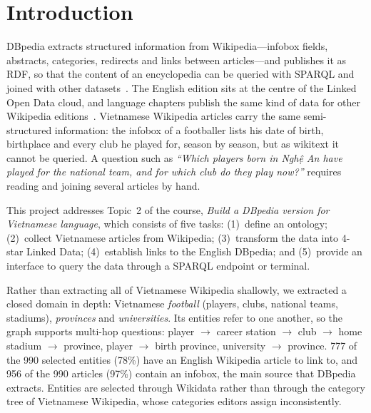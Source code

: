 \section{Introduction}

DBpedia extracts structured information from Wikipedia---infobox fields,
abstracts, categories, redirects and links between articles---and publishes it
as RDF, so that the content of an encyclopedia can be queried with SPARQL and
joined with other datasets~\cite{auer2007dbpedia, lehmann2015dbpedia}. The
English edition sits at the centre of the Linked Open Data cloud, and language
chapters publish the same kind of data for other Wikipedia
editions~\cite{kontokostas2012greek}. Vietnamese Wikipedia articles carry the
same semi-structured information: the infobox of a footballer lists his date of
birth, birthplace and every club he played for, season by season, but as
wikitext it cannot be queried. A question such as \emph{``Which players born in
Nghệ An have played for the national team, and for which club do they play
now?''} requires reading and joining several articles by hand.

This project addresses Topic~2 of the course, \emph{Build a DBpedia version for
Vietnamese language}, which consists of five tasks: (1)~define an ontology;
(2)~collect Vietnamese articles from Wikipedia; (3)~transform the data into
4-star Linked Data; (4)~establish links to the English DBpedia; and
(5)~provide an interface to query the data through a SPARQL endpoint or
terminal.

Rather than extracting all of Vietnamese Wikipedia shallowly, we extracted a
closed domain in depth: Vietnamese \emph{football} (players, clubs, national
teams, stadiums), \emph{provinces} and \emph{universities}. Its entities refer
to one another, so the graph supports multi-hop questions: player
$\rightarrow$ career station $\rightarrow$ club $\rightarrow$ home stadium
$\rightarrow$ province, player $\rightarrow$ birth province, university
$\rightarrow$ province. 777 of the 990 selected entities (78\%) have an English
Wikipedia article to link to, and 956 of the 990 articles (97\%) contain an
infobox, the main source that DBpedia extracts. Entities are selected through
Wikidata rather than through the category tree of Vietnamese Wikipedia, whose
categories editors assign inconsistently.

